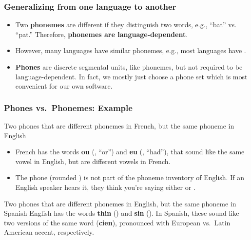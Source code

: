 \documentclass{beamer}
\newcommand{\ipa}[1]{\textipa{#1}}
\begin{document}
\begin{frame}
  \frametitle{Generalizing from one language to another}

  \begin{itemize}
  \item Two {\bf phonemes} are different if they distinguish two
    words, e.g., ``bat'' vs. ``pat.''  Therefore, {\bf phonemes are
      language-dependent}.
  \item However, many languages have similar phonemes, e.g., most
    languages have \ipa{/mama/}.
  \item {\bf Phones} are discrete segmental units, like phonemes,
    but not required to be language-dependent.  In fact, we mostly just choose
    a phone set which is most convenient for  our own  software.
  \end{itemize}
\end{frame}

\begin{frame}
  \frametitle{Phones vs.~Phonemes: Example}

  \begin{block}{Two phones that are different phonemes in French, but the same phoneme in English}
    \begin{itemize}
    \item French has the words {\bf ou} (\ipa{[u]}, ``or'') and {\bf eu}
      (\ipa{[y]}, ``had''), that sound like the same vowel in English,
      but are different vowels in French.
    \item The phone \ipa{/y/} (rounded \ipa{/i/}) is not part of the phoneme inventory of English.
      If an English speaker hears it, they think you're saying either \ipa{/u/} or \ipa{/i/}.
    \end{itemize}
  \end{block}

  \begin{block}{Two phones that are different phonemes in English, but the same phoneme in Spanish}
    English has the words {\bf thin} (\ipa{/TIn/}) and {\bf sin}
    (\ipa{/sIn/}).  In Spanish, these sound like two versions of the
    same word ({\bf cien}), pronounced with European vs.~Latin American
    accent, respectively.
  \end{block}
\end{frame}
\end{document}
